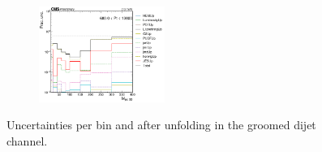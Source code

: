 \begin{figure}[ht!]
\begin{subfigure}
\end{subfigure}
  \begin{subfigure}
    \centering
    \includegraphics[width=0.45\textwidth]{figures/multijet/unfolding/dijet/unfolded_fracUnc_groomed_4.png}
\end{subfigure}
  \caption{Uncertainties per bin and after unfolding in the groomed dijet channel.}
  \label{fig:dijetunc_groomed_postunfold}
\end{figure}
